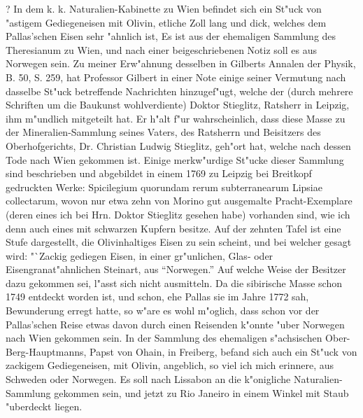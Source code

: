 \documentclass[a4paper, 11pt, oneside, polutonikogreek, german]{article}
\begin{document}
? In dem k. k. Naturalien-Kabinette zu Wien befindet sich ein St"uck von "astigem Gediegeneisen mit Olivin, etliche Zoll lang und dick, welches dem Pallas'schen Eisen sehr "ahnlich ist, Es ist aus der ehemaligen Sammlung des Theresianum zu Wien, und nach einer beigeschriebenen Notiz soll es aus Norwegen sein. Zu meiner Erw"ahnung desselben in Gilberts Annalen der Physik, B. 50, S. 259, hat Professor Gilbert in einer Note einige seiner Vermutung nach dasselbe St"uck betreffende Nachrichten hinzugef"ugt, welche der (durch mehrere Schriften um die Baukunst wohlverdiente) Doktor Stieglitz, Ratsherr in Leipzig, ihm m"undlich mitgeteilt hat. Er h"alt f"ur wahrscheinlich, dass diese Masse zu der Mineralien-Sammlung seines Vaters, des Ratsherrn und Beisitzers des Oberhofgerichts, Dr. Christian Ludwig Stieglitz, geh"ort hat, welche nach dessen Tode nach Wien gekommen ist. Einige merkw"urdige St"ucke dieser Sammlung sind beschrieben und abgebildet in einem 1769 zu Leipzig bei Breitkopf gedruckten Werke: Spicilegium quorundam rerum subterranearum Lipsiae collectarum, wovon nur etwa zehn von Morino gut ausgemalte Pracht-Exemplare (deren eines ich bei Hrn. Doktor Stieglitz gesehen habe) vorhanden sind, wie ich denn auch eines mit schwarzen Kupfern besitze. Auf der zehnten Tafel ist eine Stufe dargestellt, die Olivinhaltiges Eisen zu sein scheint, und bei welcher gesagt wird: "`Zackig gediegen Eisen, in einer gr"unlichen, Glas- oder Eisengranat"ahnlichen Steinart, aus "`Norwegen."' Auf welche Weise der Besitzer dazu gekommen sei, l"asst sich nicht ausmitteln. Da die sibirische Masse schon 1749 entdeckt worden ist, und schon, ehe Pallas sie im Jahre 1772 sah, Bewunderung erregt hatte, so w"are es wohl m"oglich, dass schon vor der Pallas'schen Reise etwas davon durch einen Reisenden k"onnte "uber Norwegen nach Wien gekommen sein. In der Sammlung des ehemaligen s"achsischen Ober-Berg-Hauptmanns, Papst von Ohain, in Freiberg, befand sich auch ein St"uck von zackigem Gediegeneisen, mit Olivin, angeblich, so viel ich mich erinnere, aus Schweden oder Norwegen. Es soll nach Lissabon an die k"onigliche Naturalien-Sammlung gekommen sein, und jetzt zu Rio Janeiro in einem Winkel mit Staub "uberdeckt liegen.
\end{document}
